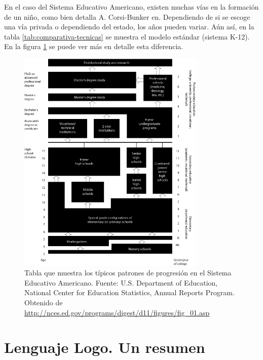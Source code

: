 En el caso del Sistema Educativo Americano, existen muchas vías en la formación de un niño, como bien detalla A. Corsi-Bunker en\cite{guide-education-us}. Dependiendo de si se escoge una vía privada o dependiendo del estado, los años pueden variar. Aún así, en la tabla \ref{tab:comparativa-tecnicas} se muestra el modelo estándar (sistema K-12). En la figura \ref{fig:education-usa} se puede ver más en detalle esta diferencia.

\begin{figure}[!ht]
	\begin{centering}
		\includegraphics[width=0.8\textwidth]{images/education-usa.png}
			\caption{Tabla que muestra los típicos patrones de progresión en el Sistema Educativo Americano. Fuente: U.S. Department of Education, National Center for Education Statistics, Annual Reports Program. Obtenido de \url{http://nces.ed.gov/programs/digest/d11/figures/fig_01.asp}}
				\label{fig:education-usa}
	\end{centering}
\end{figure}





\chapter{Lenguaje Logo. Un resumen}\label{anexo:lenguaje-logo}

